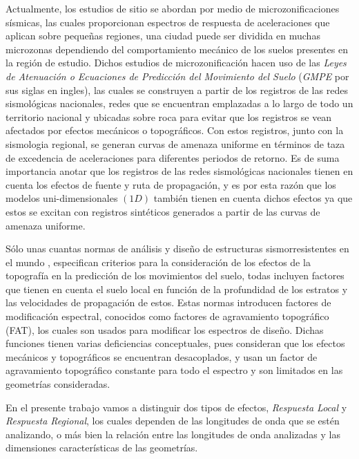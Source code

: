 \documentclass[spanish,letterpaper,12pt,twoside,openany]{article}
\begin{document}
Actualmente, los estudios de sitio se abordan por medio de microzonificaciones sísmicas, las cuales proporcionan espectros de respuesta de aceleraciones que aplican sobre pequeñas regiones, una ciudad puede ser dividida en muchas microzonas dependiendo del comportamiento mecánico de los suelos presentes en la región de estudio. Dichos estudios de microzonificación hacen uso de las \textit{Leyes de Atenuación o Ecuaciones de Predicción del Movimiento del Suelo} (\textit{GMPE} por sus siglas en ingles), las cuales se construyen a partir de los registros de las redes sismológicas nacionales, redes que se encuentran emplazadas a lo largo de todo un territorio nacional y ubicadas sobre roca para evitar que los registros se vean afectados por efectos mecánicos o topográficos. Con estos registros, junto con la sismologia regional, se generan curvas de amenaza uniforme en términos de taza de excedencia de aceleraciones para diferentes periodos de retorno. Es de suma importancia anotar que los registros de las redes sismológicas nacionales tienen en cuenta los efectos de fuente y ruta de propagación, y es por esta razón que los modelos uni-dimensionales $\left( 1D \right)$ también tienen en cuenta dichos efectos ya que estos se excitan con registros sintéticos generados a partir de las curvas de amenaza uniforme.

Sólo unas cuantas normas de análisis y diseño de estructuras sismorresistentes en el mundo \citep{EC8, AFPS1995}, especifican criterios para la consideración de los efectos de la topografía en la predicción de los movimientos del suelo, todas incluyen factores que tienen en cuenta el suelo local en función de la profundidad de los estratos y las velocidades de propagación de estos. Estas normas introducen factores de modificación espectral, conocidos como factores de agravamiento topográfico (FAT), los cuales son usados para modificar los espectros de diseño. Dichas funciones tienen varias deficiencias conceptuales, pues consideran que los efectos mecánicos y topográficos se encuentran desacoplados, y usan un factor de agravamiento topográfico constante para todo el espectro y son limitados en las geometrías consideradas.

En el presente trabajo vamos a distinguir dos tipos de efectos, \textit{Respuesta Local} y \textit{Respuesta Regional}, los cuales dependen de las longitudes de onda que se estén analizando, o más bien la relación entre las longitudes de onda analizadas y las dimensiones características de las geometrías.
\end{document}
